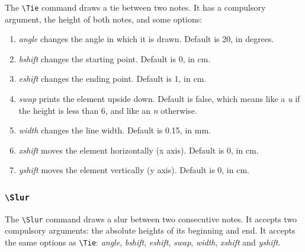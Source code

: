\documentclass[final]{article}
\newcommand{\TTT}[2][0]{\Text[yshift=#1]{\texttt{\textbackslash #2}}}
\begin{document}
	The \verb|\Tie| command draws a tie between two notes. It has a compulsory argument, the height of both notes, and some options:
	
	\begin{enumerate}[-]
		\item \textsl{angle} changes the angle in which it is drawn. Default is 20, in degrees.
		\item \textsl{bshift} changes the starting point. Default is 0, in cm.
		\item \textsl{eshift} changes the ending point. Default is 1, in cm.
		\item \textsl{swap} prints the element upside down. Default is false, which means like a \textit{u} if the height is less than 6, and like an \textit{n} otherwise.
		\item \textsl{width} changes the line width. Default is 0.15, in mm.
		\item \textsl{xshift} moves the element horizontally (x axis). Default is 0, in cm.
		\item \textsl{yshift} moves the element vertically (y axis). Default is 0, in cm.
	\end{enumerate}
	
	\begin{center}
		\begin{mousik}
			\Clef
			\Space[1]
			\TTT{Tie[eshift=2]\{6\}}
			\Space[-1]
			\Barline
			\Space[0.5]
			\TTT{Tie\{4\}}
			\Space[-0.5]
			\Barline[t=|.]
		\end{mousik}
	\end{center}

	\subsubsection{\texttt{\textbackslash Slur}}
	The \verb|\Slur| command draws a slur between two consecutive notes. It accepts two compulsory arguments: the absolute heights of its beginning and end. It accepts the same options as \verb|\Tie|: \textsl{angle}, \textsl{bshift}, \textsl{eshift}, \textsl{swap}, \textsl{width}, \textsl{xshift} and \textsl{yshift}.
	
	\begin{center}
		\begin{mousik}
			\Clef
			\Space[0.5]
			\TTT{Slur\{4\}\{7\}}
			\Space[-0.5]
			\Note{4}{4}
			\Slur{4}{7}
			\Note{4}{7}
			\Barline[t=|.]
		\end{mousik}
	\end{center}
	
\end{document}
